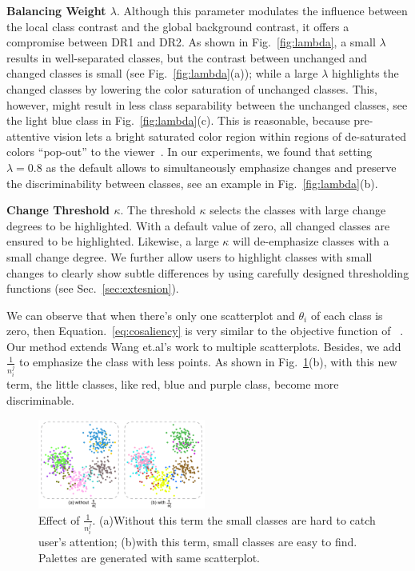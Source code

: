 \noindent\textbf{Balancing Weight $\lambda$}.
Although this parameter modulates the influence between the local class contrast and the global background contrast, it offers a compromise between DR1 and DR2.
As shown in Fig.~\ref{fig:lambda}, a small $\lambda$ results in well-separated classes, but the contrast between unchanged and changed classes is small (see Fig.~\ref{fig:lambda}(a)); while a large $\lambda$ highlights the changed classes by lowering the color saturation of unchanged classes. This, however, might result in less class separability between the unchanged classes,  see the light blue class in Fig.~\ref{fig:lambda}(c).
This is reasonable, because  pre-attentive vision
lets a bright saturated color region within  regions of de-saturated colors ``pop-out'' to the viewer~\cite{healey1995visualizing}.
In our experiments, we found that setting  $\lambda=0.8$ as the default allows to simultaneously emphasize changes and preserve the discriminability between classes, see an example in Fig.~\ref{fig:lambda}(b).


\vspace{1.5mm}
\noindent\textbf{Change Threshold $\kappa$}.
The threshold $\kappa$ selects the classes with large change degrees to be highlighted.
With a default value of zero, all changed classes are ensured to be highlighted. Likewise, a large $\kappa$ will de-emphasize classes with a small change degree.
We further allow users to highlight classes with small changes to clearly show  subtle differences by using carefully designed thresholding functions (see Sec.~\ref{sec:extesnion}).


We can observe that when there's only one scatterplot and $\theta_i$ of each class is zero, then Equation.~\ref{eq:cosaliency} is very similar to the objective function of ~\cite{Wang2018}. Our method extends Wang et.al's work to multiple scatterplots. Besides, we add $\frac{1}{n^j_i}$ to emphasize the class with less points. As shown in Fig.~\ref{fig:nij}(b), with this new term, the little classes, like red, blue and purple class, become more discriminable.

\begin{figure}[!t]
\centering
\includegraphics[width=0.49\textwidth]{figures/nij.pdf}
\caption{Effect of $\frac{1}{n^j_i}$. (a)Without this term the small classes are hard to catch user's attention; (b)with this term, small classes are easy to find. Palettes are generated with same scatterplot.}
\vspace*{-3mm}
\label{fig:nij}
\end{figure}
\vspace{.5em}